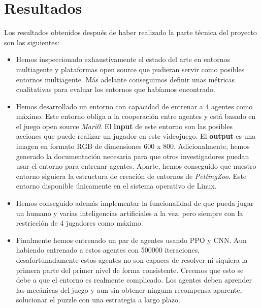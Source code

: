 \chapter{Resultados}
\label{section:Resultados}

Los resultados obtenidos después de haber realizado la parte técnica del proyecto son los siguientes:
\begin{itemize}
    \item Hemos inspeccionado exhaustivamente el estado del arte en entornos multiagente y plataformas open source que pudieran servir como posibles entornos multiagente. Más adelante conseguimos definir unas métricas cualitativas para evaluar los entornos que habíamos encontrado.
    \item Hemos desarrollado un entorno con capacidad de entrenar a 4 agentes como máximo. Este entorno obliga a la cooperación entre agentes y está basado en el juego open source \textit{Mari0}. El \textbf{input} de este entorno son las posibles acciones que puede realizar un jugador en este videojuego. El \textbf{output} es una imagen en formato RGB de dimensiones 600 x 800. Adicionalmente, hemos generado la documentación necesaria para que otros investigadores puedan usar el entorno para entrenar agentes. Aparte, hemos conseguido que nuestro entorno siguiera la estructura de creación de entornos de \textit{PettingZoo}. Este entorno disponible únicamente en el sistema operativo de Linux.
    \item Hemos conseguido además implementar la funcionalidad de que pueda jugar un humano y varias inteligencias artificiales a la vez, pero siempre con la restricción de 4 jugadores como máximo.
    \item Finalmente hemos entrenado un par de agentes usando PPO y CNN. Aun habiendo entrenado a estos agentes con 500000 iteraciones, desafortunadamente estos agentes no son capaces de resolver ni siquiera la primera parte del primer nivel de forma consistente. Creemos que esto se debe a que el entorno es realmente complicado. Los agentes deben aprender las mecánicas del juego y aun sin obtener ninguna recompensa aparente, solucionar el puzzle con una estrategia a largo plazo.

\end{itemize}

